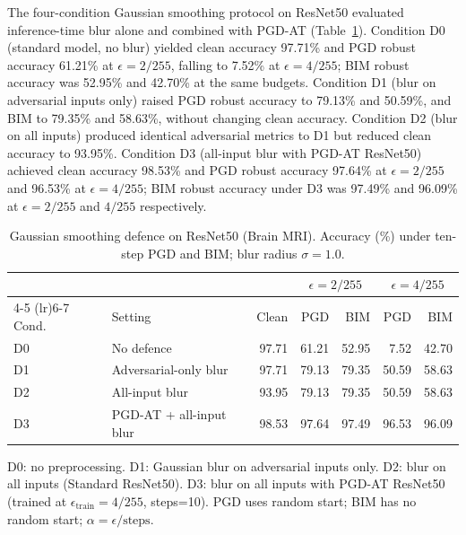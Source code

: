 \documentclass[12pt,a4paper,oneside]{report}
\newcommand{\train}{\mathrm{train}}
\begin{document}
The four-condition Gaussian smoothing protocol on ResNet50 evaluated inference-time blur alone and combined with PGD-AT (Table~\ref{tab:gaussian_defense_resnet50}). Condition D0 (standard model, no blur) yielded clean accuracy 97.71\% and PGD robust accuracy 61.21\% at $\epsilon = 2/255$, falling to 7.52\% at $\epsilon = 4/255$; BIM robust accuracy was 52.95\% and 42.70\% at the same budgets. Condition D1 (blur on adversarial inputs only) raised PGD robust accuracy to 79.13\% and 50.59\%, and BIM to 79.35\% and 58.63\%, without changing clean accuracy. Condition D2 (blur on all inputs) produced identical adversarial metrics to D1 but reduced clean accuracy to 93.95\%. Condition D3 (all-input blur with PGD-AT ResNet50) achieved clean accuracy 98.53\% and PGD robust accuracy 97.64\% at $\epsilon = 2/255$ and 96.53\% at $\epsilon = 4/255$; BIM robust accuracy under D3 was 97.49\% and 96.09\% at $\epsilon = 2/255$ and $4/255$ respectively.

\begin{table}[htbp]
  \centering
  \caption{Gaussian smoothing defence on ResNet50 (Brain MRI). Accuracy (\%) under ten-step PGD and BIM; blur radius $\sigma=1.0$.}
  \label{tab:gaussian_defense_resnet50}
  \begin{tabular}{llrrrrr}
    \toprule
    & & & \multicolumn{2}{c}{$\epsilon=2/255$} & \multicolumn{2}{c}{$\epsilon=4/255$} \\
    \cmidrule(lr){4-5} \cmidrule(lr){6-7}
    Cond. & Setting & Clean & PGD & BIM & PGD & BIM \\
    \midrule
    D0 & No defence          & 97.71 & 61.21 & 52.95 &  7.52 & 42.70 \\
    D1 & Adversarial-only blur & 97.71 & 79.13 & 79.35 & 50.59 & 58.63 \\
    D2 & All-input blur      & 93.95 & 79.13 & 79.35 & 50.59 & 58.63 \\
    D3 & PGD-AT + all-input blur & 98.53 & 97.64 & 97.49 & 96.53 & 96.09 \\
    \bottomrule
  \end{tabular}
  \vspace{0.25em}
  \begin{minipage}{0.92\linewidth}
    \footnotesize
    D0: no preprocessing. D1: Gaussian blur on adversarial inputs only.
    D2: blur on all inputs (Standard ResNet50).
    D3: blur on all inputs with PGD-AT ResNet50 (trained at $\epsilon_{\train}=4/255$, steps=10).
    PGD uses random start; BIM has no random start; $\alpha=\epsilon/\text{steps}$.
  \end{minipage}
\end{table}
\end{document}
